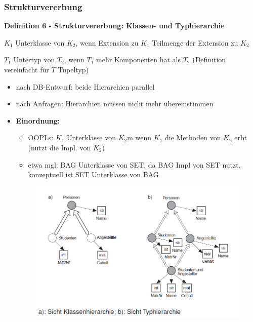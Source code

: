 \subsubsection{Strukturvererbung}
\begin{framed}
	\textbf{Definition 6 - Strukturvererbung: Klassen- und Typhierarchie}
	\begin{description}
		\item $K_1$ Unterklasse von $K_2$, wenn Extension zu $K_1$ Teilmenge der Extension zu $K_2$
		\item $T_1$ Untertyp von $T_2$, wenn $T_1$ mehr Komponenten hat als $T_2$ (Definition vereinfacht für $T$ Tupeltyp)
	\end{description}
\end{framed}

\begin{itemize}
	\item nach DB-Entwurf: beide Hierarchien parallel
	\item nach Anfragen: Hierarchien müssen nicht mehr übereinstimmen
	
	\item \textbf{Einordnung:}
	\begin{itemize}
		\item OOPLs: $K_1$ Unterklasse von $K_2$m wenn $K_1$ die Methoden von $K_2$ erbt (nutzt die Impl. von $K_2$)
		\item etwa mgl: BAG Unterklasse von SET, da BAG Impl von SET nutzt, konzeptuell ist SET Unterklasse von BAG
	\end{itemize}
	
	\begin{figure}[!h]
		\centering
		\includegraphics[scale=0.6]{img/struc_inheritance_ex.png}
	\end{figure}
	

\end{itemize}
